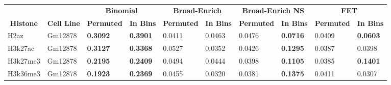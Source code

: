 \begin{table}[!ht]
\tiny
\centering
\begin{tabular}{ll|ll|ll|ll|ll}
\multicolumn{2}{l}{}                                        & \multicolumn{2}{c}{{\color[HTML]{000000} \textbf{Binomial}}}                                                               & \multicolumn{2}{c}{\textbf{Broad-Enrich}}                                    & \multicolumn{2}{c}{\textbf{Broad-Enrich NS}}                                   & \multicolumn{2}{c}{\textbf{FET}}                                               \\
\multicolumn{1}{c}{\textbf{Histone}} & \multicolumn{1}{c}{\textbf{Cell Line}} & \multicolumn{1}{c}{{\color[HTML]{000000} \textbf{Permuted}}} & \multicolumn{1}{c}{{\color[HTML]{000000} \textbf{In Bins}}} & \multicolumn{1}{c}{\textbf{Permuted}} & \multicolumn{1}{c}{\textbf{In Bins}} & \multicolumn{1}{c}{\textbf{Permuted}} & \multicolumn{1}{c}{\textbf{In Bins}}   & \multicolumn{1}{c}{\textbf{Permuted}} & \multicolumn{1}{c}{\textbf{In Bins}}   \\\hline
H2az                                 & Gm12878                                & {\color[HTML]{CB0000} \textbf{0.3092}}                       & {\color[HTML]{CB0000} \textbf{0.3901}}                      & 0.0411                                & 0.0463                               & 0.0476                                & \textbf{0.0716}                        & 0.0409                                & \textbf{0.0603}                        \\
H3k27ac                              & Gm12878                                & {\color[HTML]{CB0000} \textbf{0.3127}}                       & {\color[HTML]{CB0000} \textbf{0.3368}}                      & 0.0527                                & 0.0352                               & 0.0426                                & {\color[HTML]{CB0000} \textbf{0.1295}} & 0.0387                                & 0.0398                                 \\
H3k27me3                             & Gm12878                                & {\color[HTML]{CB0000} \textbf{0.2195}}                       & {\color[HTML]{CB0000} \textbf{0.2409}}                      & 0.0494                                & 0.0444                               & 0.0398                                & {\color[HTML]{CB0000} \textbf{0.1105}} & 0.0385                                & {\color[HTML]{CB0000} \textbf{0.1401}} \\
H3k36me3                             & Gm12878                                & {\color[HTML]{CB0000} \textbf{0.1923}}                       & {\color[HTML]{CB0000} \textbf{0.2369}}                      & 0.0455                                & 0.0320                               & 0.0381                                & {\color[HTML]{CB0000} \textbf{0.1375}} & 0.0411                                & 0.0307                                 \\

\end{tabular}
\end{table}
